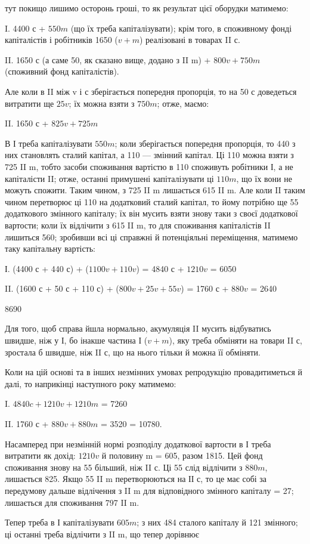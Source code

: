 \parcont{}  %
тут покищо лишимо осторонь гроші, то як результат цієї оборудки
матимемо:

I.    4400 с + $550 m$ (що їх треба капіталізувати); крім того, в споживному
фонді капіталістів і робітників 1650 ($v + m$) реалізовані в
товарах II с.

II.    1650 с (а саме 50, як сказано вище, додано з II m) + $800 v +
750 m$ (споживний фонд капіталістів).

Але коли в II між v і с зберігається попередня пропорція, то на 50 с
доведеться витратити ще $25 v$; їх можна взяти з $750 m$; отже, маємо:

II. 1650 с + $825 v + 725 m$

В І треба капіталізувати $550 m$; коли зберігається попередня пропорція,
то 440 з них становлять сталий капітал, а 110 — змінний капітал.
Ці 110 можна взяти з 725 II m, тобто засоби споживання вартістю в
110 споживуть робітники І, а не капіталісти II; отже, останні примушені
капіталізувати ці $110 m$, що їх вони не можуть спожити. Таким чином,
з 725 II m лишається 615 II m. Але коли II таким чином перетворює
ці 110 на додатковий сталий капітал, то йому потрібно ще 55 додаткового
змінного капіталу; їх він мусить взяти знову таки з своєї додаткової
вартости; коли їх відлічити з 615 II m, то для споживання капіталістів II
лишиться 560; зробивши всі ці справжні й потенціяльні переміщення,
матимемо таку капітальну вартість:

І. (4400 с + 440 с) + ($1100v + 110 v$) = 4840 с + $1210 v$ = 6050

II. (1600 с + 50 с + 110 с) + ($800 v + 25 v + 55 v$) = 1760 с + $880 v$ = 2640

8690

Для того, щоб справа йшла нормально, акумуляція II мусить відбуватись
швидше, ніж у І, бо інакше частина І ($v + m$), яку треба обміняти
на товари II с, зростала б швидше, ніж II с, що на нього тільки й можна
її обміняти.

Коли на цій основі та в інших незмінних умовах репродукцію провадитиметься
й далі, то наприкінці наступного року матимемо:

I.    $4840 c + 1210 v + 1210 m$ = 7260

II.    1760 с + $880 v + 880 m$ = 3520
= 10780.

Насамперед при незмінній нормі розподілу додаткової вартости в І
треба витратити як дохід: $1210 v$ й половину m = 605, разом 1815.
Цей фонд споживання знову на 55 більший, ніж II с. Ці 55 слід відлічити
з $880 m$, лишається 825. Якщо 55 II m перетворюються на ІІ с, то це
має собі за передумову дальше відлічення з II m для відповідного змінного
капіталу = 27; лишається для споживання 797 II m.

Тепер треба в І капіталізувати $605 m$; з них 484 сталого капіталу й
121 змінного; ці останні треба відлічити з II m, що тепер дорівнює
\parbreak{}  %
